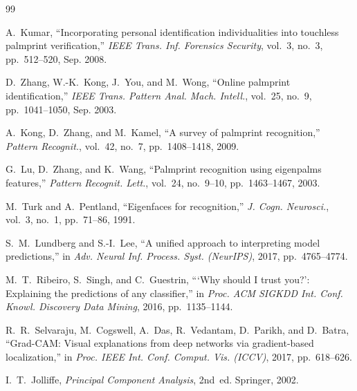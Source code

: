 \documentclass[conference]{IEEEtran}
\begin{document}
\begin{thebibliography}{99}

A.~Kumar, ``Incorporating personal identification individualities into touchless palmprint verification,'' \emph{IEEE Trans. Inf. Forensics Security}, vol.~3, no.~3, pp.~512--520, Sep. 2008.

D.~Zhang, W.-K.~Kong, J.~You, and M.~Wong, ``Online palmprint identification,'' \emph{IEEE Trans. Pattern Anal. Mach. Intell.}, vol.~25, no.~9, pp.~1041--1050, Sep. 2003.

A.~Kong, D.~Zhang, and M.~Kamel, ``A survey of palmprint recognition,'' \emph{Pattern Recognit.}, vol.~42, no.~7, pp.~1408--1418, 2009.

G.~Lu, D.~Zhang, and K.~Wang, ``Palmprint recognition using eigenpalms features,'' \emph{Pattern Recognit. Lett.}, vol.~24, no.~9--10, pp.~1463--1467, 2003.

M.~Turk and A.~Pentland, ``Eigenfaces for recognition,'' \emph{J. Cogn. Neurosci.}, vol.~3, no.~1, pp.~71--86, 1991.

S.~M.~Lundberg and S.-I.~Lee, ``A unified approach to interpreting model predictions,'' in \emph{Adv. Neural Inf. Process. Syst. (NeurIPS)}, 2017, pp.~4765--4774.

M.~T.~Ribeiro, S.~Singh, and C.~Guestrin, ```Why should I trust you?': Explaining the predictions of any classifier,'' in \emph{Proc. ACM SIGKDD Int. Conf. Knowl. Discovery Data Mining}, 2016, pp.~1135--1144.

R.~R.~Selvaraju, M.~Cogswell, A.~Das, R.~Vedantam, D.~Parikh, and D.~Batra, ``Grad-CAM: Visual explanations from deep networks via gradient-based localization,'' in \emph{Proc. IEEE Int. Conf. Comput. Vis. (ICCV)}, 2017, pp.~618--626.

I.~T.~Jolliffe, \emph{Principal Component Analysis}, 2nd~ed. Springer, 2002.

\end{thebibliography}
\end{document}
